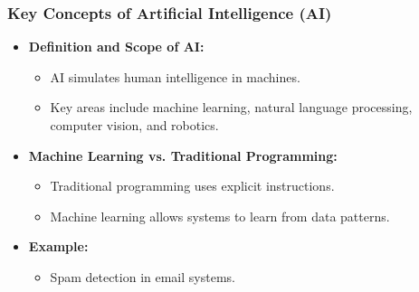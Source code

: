 \documentclass[aspectratio=169]{beamer}
\begin{document}
\begin{frame}[fragile]
    \frametitle{Key Concepts of Artificial Intelligence (AI)}
    \begin{itemize}
        \item \textbf{Definition and Scope of AI:}
            \begin{itemize}
                \item AI simulates human intelligence in machines.
                \item Key areas include machine learning, natural language processing, computer vision, and robotics.
            \end{itemize}
        \item \textbf{Machine Learning vs. Traditional Programming:}
            \begin{itemize}
                \item Traditional programming uses explicit instructions.
                \item Machine learning allows systems to learn from data patterns.
            \end{itemize}
        \item \textbf{Example:} 
            \begin{itemize}
                \item Spam detection in email systems.
            \end{itemize}
    \end{itemize}
\end{frame}
\end{document}
